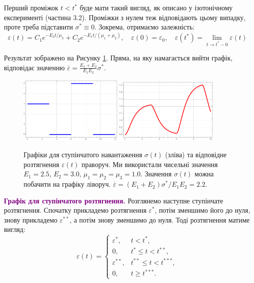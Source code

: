 \documentclass{hw_template}
\begin{document}
Перший проміжок $t < t^*$ буде мати такий вигляд, як описано у ізотонічному
експерименті (частина 3.2). Проміжки з нулем теж відповідають цьому випадку,
проте треба підставити $\sigma^* \equiv 0$. Зокрема, отримаємо залежність:
\begin{equation*}
    \varepsilon(t) = C_1e^{-E_2t/\mu_3} + C_2e^{-E_1t/(\mu_1+\mu_2)}, \quad \varepsilon(0) = \varepsilon_0, \quad \varepsilon(t^*) = \lim_{t \to t^*-0}\varepsilon(t)
\end{equation*}

Результат зображено на Рисунку \ref{fig:piecewise_2}. Пряма, на яку намагається 
вийти графік, відповідає значенню $\overline{\varepsilon} = \frac{E_1+E_2}{E_1E_2}\sigma^*$.

\begin{figure}[H]
    \centering
    \includegraphics[width=0.45\textwidth]{images/exam/st_piecewise.pdf}
    \includegraphics[width=0.45\textwidth]{images/exam/et_piecewise.pdf}
    \caption{Графіки для ступінчатого навантаження $\sigma(t)$ (зліва) та відповідне 
    розтягнення $\varepsilon(t)$ праворуч. Ми використали чисельні значення 
    $E_1=2.5$, $E_2=3.0$, $\mu_1=\mu_2=\mu_3=1.0$. Значення $\sigma(t)$ можна 
    побачити на графіку ліворуч. $\overline{\varepsilon} = (E_1+E_2)\sigma^*/E_1E_2 = 2.2$.}
    \label{fig:piecewise_2}
\end{figure}

\textcolor{purple}{\textbf{Графік для ступінчатого розтягнення.}} Розглянемо
наступне ступінчате розтягнення. Спочатку прикладемо розтягнення $\varepsilon^*$, потім
зменшимо його до нуля, знову прикладемо $\varepsilon^{**}$, а потім знову зменшимо до нуля.
Тоді розтягнення матиме вигляд:
\begin{equation*}
    \varepsilon(t) = \begin{cases}
        \varepsilon^*, & t < t^*, \\
        0, & t^* \leq t < t^{**}, \\
        \varepsilon^{**}, & t^{**} \leq t < t^{***}, \\
        0, & t \geq t^{***}.
    \end{cases}
\end{equation*}
\end{document}
